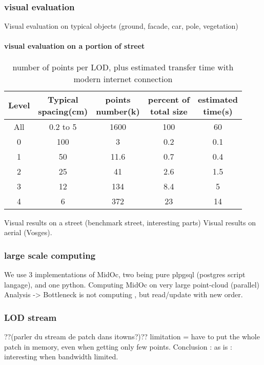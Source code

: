 		\subsubsection{visual evaluation}
			Visual evaluation on typical objects (ground, facade, car, pole, vegetation)
			\paragraph{visual evaluation on a portion of street}
			
			\begin{table}[ht]
				\centering
				\caption{ number of points per LOD, plus estimated transfer time with modern internet connection}
				\scriptsize 
				\begin{tabular}{|c|c|c|c|c|}
				\hline Level & \shortstack{Typical \\ spacing(cm)} & \shortstack{ points \\ number(k)} & \shortstack{percent of \\ total size} & \shortstack{estimated \\ time(s)} \\ 
				\hline All & 0.2 to 5  & 1600 & 100 & 60 \\ 
				\hline 0 & 100 & 3 & 0.2 & 0.1 \\ 
				\hline 1 & 50 & 11.6 & 0.7 & 0.4 \\ 
				\hline 2 & 25 & 41 & 2.6 & 1.5 \\ 
				\hline 3 & 12 & 134 & 8.4 & 5 \\ 
				\hline 4 & 6 & 372 & 23 & 14 \\  
				
				\hline 
				\end{tabular} 
			\end{table}
				
			Visual results on a street (benchmark street, interesting parts)
			Visual results on aerial (Vosges).
		\subsubsection{large scale computing}
			We use 3 implementations of MidOc, two being pure plpgsql (postgres script langage), and one python.
			Computing MidOc on very large point-cloud (parallel)
			Analysis -> Bottleneck is not computing , but read/update with new order. 
		\subsubsection{LOD stream}
			??(parler du stream de patch dans itowns?)??
			limitation = have to put the whole patch in memory, even when getting only few points.
			Conclusion : as is : interesting when bandwidth limited.  
